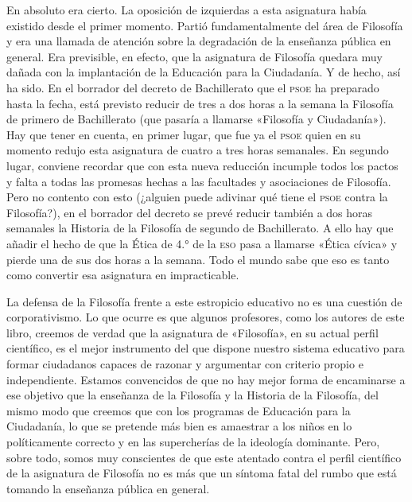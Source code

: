 \documentclass[draft,9pt,letterpaper,twocolumn,openany]{extbook}
\begin{document}
En absoluto era cierto. La oposición de izquierdas a esta asignatura había existido desde el primer momento. Partió fundamentalmente del área de Filosofía y era
una llamada de atención sobre la degradación de la enseñanza pública en general. Era previsible, en efecto, que la asignatura de Filosofía quedara muy dañada
con la implantación de la Educación para la Ciudadanía. Y de hecho, así ha sido.
En el borrador del decreto de Bachillerato que el \textsc{psoe} ha preparado hasta la fecha, está previsto reducir de tres a dos horas a la semana la Filosofía de primero
 de Bachillerato (que pasaría a llamarse «Filosofía y Ciudadanía»). Hay que tener en
cuenta, en primer lugar, que fue ya el \textsc{psoe} quien en su momento redujo esta asignatura de cuatro a tres horas semanales. En segundo lugar, conviene recordar que
con esta nueva reducción incumple todos los pactos y falta a todas las promesas
hechas a las facultades y asociaciones de Filosofía. Pero no contento con esto
(¿alguien puede adivinar qué tiene el \textsc{psoe} contra la Filosofía?), en el borrador del
decreto se prevé reducir también a dos horas semanales la Historia de la Filosofía de segundo de Bachillerato. A ello hay que añadir el hecho de que la Ética de
4.° de la \textsc{eso} pasa a llamarse «Ética cívica» y pierde una de sus dos horas a la semana. Todo el mundo sabe que eso es tanto como convertir esa asignatura en impracticable.

La defensa de la Filosofía frente a este estropicio educativo no es una cuestión
de corporativismo. Lo que ocurre es que algunos profesores, como los autores de
este libro, creemos de verdad que la asignatura de «Filosofía», en su actual perfil
científico, es el mejor instrumento del que dispone nuestro sistema educativo para
formar ciudadanos capaces de razonar y argumentar con criterio propio e independiente. Estamos convencidos de que no hay mejor forma de encaminarse a ese
objetivo que la enseñanza de la Filosofía y la Historia de la Filosofía, del mismo
modo que creemos que con los programas de Educación para la Ciudadanía, lo
que se pretende más bien es amaestrar a los niños en lo políticamente correcto y
en las supercherías de la ideología dominante. Pero, sobre todo, somos muy conscientes de que este atentado contra el perfil científico de la asignatura de Filosofía no es más que un síntoma fatal del rumbo que está tomando la enseñanza
pública en general. 
\end{document}
